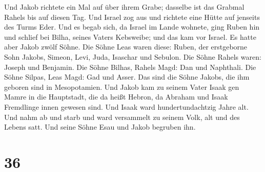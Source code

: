 Und Jakob richtete ein Mal auf über ihrem Grabe; dasselbe ist das
Grabmal Rahels bis auf diesen Tag.  Und Israel zog aus und
richtete eine Hütte auf jenseits des Turms Eder.  Und es
begab sich, da Israel im Lande wohnete, ging Ruben hin und schlief bei
Bilha, seines Vaters Kebsweibe; und das kam vor Israel. Es hatte aber
Jakob zwölf Söhne.  Die Söhne Leas waren diese: Ruben, der
erstgeborne Sohn Jakobs, Simeon, Levi, Juda, Isaschar und Sebulon.
 Die Söhne Rahels waren: Joseph und Benjamin. 
Die Söhne Bilhas, Rahels Magd: Dan und Naphthali.  Die
Söhne Silpas, Leas Magd: Gad und Asser. Das sind die Söhne Jakobs, die
ihm geboren sind in Mesopotamien.  Und Jakob kam zu seinem
Vater Isaak gen Mamre in die Hauptstadt, die da heißt Hebron, da Abraham
und Isaak Fremdlinge innen gewesen sind.  Und Isaak ward
hundertundachtzig Jahre alt.  Und nahm ab und starb und
ward versammelt zu seinem Volk, alt und des Lebens satt. Und seine Söhne
Esau und Jakob begruben ihn.

\hypertarget{section-35}{%
\section{36}\label{section-35}}


